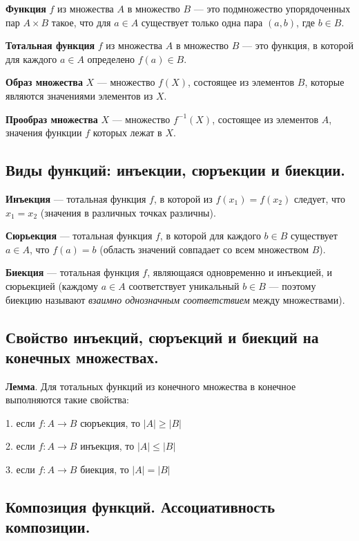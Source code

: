 \documentclass[a4paper, 10pt]{article}
\begin{document}
\textbf{Функция} $f$ из множества $A$ в множество $B$ --- это подмножество упорядоченных пар $A \times B$ такое, что для $a \in A$ существует только одна пара $(a,b)$, где $b \in B$.

\textbf{Тотальная функция} $f$ из множества $A$ в множество $B$ --- это функция, в которой для каждого $a \in A$ определено $f(a) \in B$.

\vspace{2mm}

\textbf{Образ множества} $X$ --- множество $f(X)$, состоящее из элементов $B$, которые являются значениями элементов из $X$.

\textbf{Прообраз множества} $X$ --- множество $f^{-1}(X)$, состоящее из элементов $A$, значения функции $f$ которых лежат в $X$.


\subsection{Виды функций: инъекции, сюръекции и биекции.}

\textbf{Инъекция} --- тотальная функция $f$, в которой из $f(x_1)=f(x_2)$ следует, что $x_1=x_2$ (значения в различных точках различны).

\textbf{Сюрьекция} --- тотальная функция $f$, в которой для каждого $b \in B$ существует $a \in A$, что $f(a)=b$ (область значений совпадает со всем множеством $B$).

\textbf{Биекция} --- тотальная функция $f$, являющаяся одновременно и инъекцией, и сюрьекцией (каждому $a \in A$ соответствует уникальный $b \in B$ --- поэтому биекцию называют \textit{взаимно однозначным соответствием} между множествами).



\subsection{Свойство инъекций, сюръекций и биекций на конечных множествах.}

\textbf{Лемма}. Для тотальных функций из конечного множества в конечное выполняются такие свойства:

1. если $f\colon A \to B$ сюръекция, то $|A| \geqslant |B|$

2. если $f\colon A \to B$ инъекция, то $|A| \leqslant |B|$

3. если $f\colon A \to B$ биекция, то $|A| = |B|$


\subsection{Композиция функций. Ассоциативность композиции.}
\end{document}
